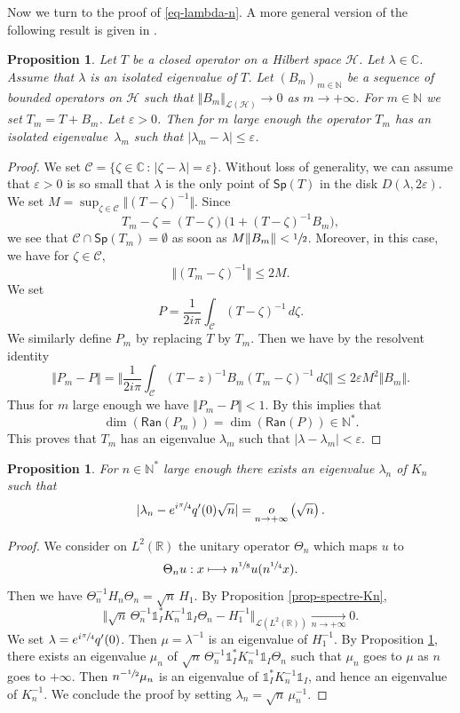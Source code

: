 \documentclass[10pt]{amsart}
\let\mathcal\mathscr
\def\mto{\mathchoice{\longmapsto}{\mapsto}{\mapsto}{\mapsto}}
\theoremstyle{plain}
\newtheorem{proposition}[theorem]{Proposition}
\theoremstyle{definition}
\newcommand {\limt}[2]{\xrightarrow[#1 \to #2]{}}
\newcommand{\abs}[1]{\vert #1\vert}
\newcommand{\nr}[1]{\Vert #1\Vert}
\newcommand{\bnr}[1]{\bigl\Vert #1\bigr\Vert}
\newcommand{\bbnr}[1]{\biggl\Vert #1\biggr\Vert}
\newcommand{\set}[1]{\{ #1\}}
\newcommand{\inv}{^{-1}}
\newcommand{\littleo}[2]{\mathop{o}\limits_{#1 \to #2}}
\newcommand{\1}{\mathds 1}
\newcommand{\st}{\,:\,}
\newcommand{\Sp}{\mathsf{Sp}}
\newcommand{\Ran}{\mathsf{Ran}}
\newcommand{\R}{\mathbb{R}}
\def\C{\mathbb{C}}
\newcommand{\N}{\mathbb{N}}
\let\e\varepsilon
\let\z\zeta
\let\Th\Theta
\let\l\lambda
\let\m\mu
\newcommand{\Hc}{{\mathcal H}}
\newcommand{\Lc}{{\mathcal L}}
\begin{document}
Now we turn to the proof of \eqref{eq-lambda-n}. A more general version of the following result is given in \cite[\S IV.3.5]{kato}.

\begin{proposition} \label{prop-perturbation-vp-kato}
Let $T$ be a closed operator on a Hilbert space $\Hc$. Let $\l \in \C$. Assume that $\l$ is an isolated eigenvalue of $T$. Let $(B_m)_{m \in \N}$ be a sequence of bounded operators on $\Hc$ such that $\nr{B_m}_{\Lc(\Hc)} \to 0$ as $m \to +\infty$. For $m \in \N$ we set \hbox{$T_m = T+B_m$}. Let $\e > 0$. Then for $m$ large enough the operator $T_m$ has an isolated eigenvalue~$\l_m$ such that $\abs{\l_m-\l} \leq \e$.
\end{proposition}

\begin{proof}
We set $\mathcal C = \set {\z \in \C\st \abs {\z - \l} = \e}$. Without loss of generality, we can assume that $\e> 0$ is so small that $\l$ is the only point of $\Sp(T)$ in the disk $D(\l,2\e)$. We set $M = \sup_{\z \in \mathcal C} \nr{(T-\z)\inv}$. Since
\[
T_m - \z = (T-\z) \bigl(1 + (T-\z)\inv B_m \bigr),
\]
we see that $\mathcal C \cap \Sp(T_m) = \emptyset$ as soon as $M \nr{B_m} < \sfrac 1 2$. Moreover, in this case, we have for $\z \in \mathcal C$,
\[
\nr{(T_m-\z)\inv} \leq 2 M.
\]
We set
\[
P = \frac 1 {2i\pi} \int_{\mathcal C} (T-\z)\inv \, d\z.
\]
We similarly define $P_m$ by replacing $T$ by $T_m$. Then we have by the resolvent identity
\[
\nr{P_m - P} = \bbnr{\frac 1 {2i\pi} \int_{\mathcal C} (T-z)\inv B_m (T_m-\z)\inv \, d\z} \leq 2\e M^2 \Vert B_m \Vert.
\]
Thus for $m$ large enough we have $\nr{P_m - P} < 1$. By \cite[\S I.4.6]{kato} this implies that
\[
\dim (\Ran (P_m)) = \dim (\Ran (P)) \in \N^*.
\]
This proves that $T_m$ has an eigenvalue $\l_m$ such that $\abs{\l - \l_m} < \e$.
\end{proof}

\begin{proposition} \label{prop-lambda-n}
For $n \in \N^*$ large enough there exists an eigenvalue $\l_n$ of $K_n$ such that
\[
\abs{\l_n -e^{i\sfrac \pi 4} q'(0) \sqrt n } = \littleo n {+\infty} \left(\sqrt n \right).
\]
\end{proposition}

\begin{proof}
We consider on $L^2(\R)$ the unitary operator $\Th_n$ which maps $u$ to
\[
\Th_n u : x \mto n^{\sfrac 18} u(n^{\sfrac 14} x).
\]
Then we have $\Th_n\inv H_n \Th_n = \sqrt n\,H_1$. By Proposition \ref{prop-spectre-Kn},
\[
\bnr{\sqrt n\,\Th_n\inv \1_I^* K_n\inv \1_I \Th_n - H_1\inv}_{\Lc(L^2(\R))} \limt n {+\infty} 0.
\]
We set $\l = e^{i\sfrac \pi 4} q'(0)$. Then $\m = \l\inv$ is an eigenvalue of $H_1\inv$. By Proposition \ref{prop-perturbation-vp-kato}, there exists an eigenvalue $\m_n$ of $\sqrt n\,\Th_n\inv \1_I^* K_n \inv \1_I \Th_n$ such that $\m_n$ goes to $\m$ as $n$ goes to $+\infty$. Then $n^{-\sfrac 12} \m_n$ is an eigenvalue of $\1_I^* K_n\inv \1_I$, and hence an eigenvalue of $K_n\inv$. We conclude the proof by setting $\l_n = \sqrt n\,\m_n\inv$.
\end{proof}
\end{document}
